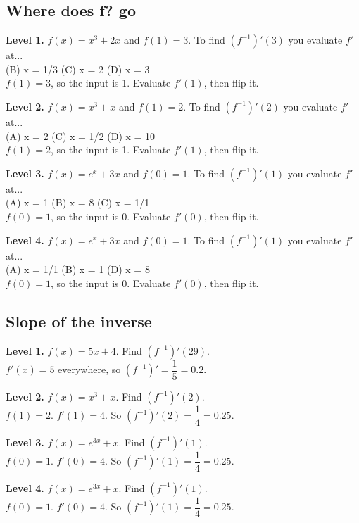 \documentclass[11pt]{article}
\begin{document}
\subsection*{Where does f? go}
\noindent\textbf{Level 1.} $f(x)=x^{3}+2x$ and $f(1)=3$. To find $(f^{-1})'(3)$ you evaluate $f'$ at...\\  \quad (B) x = 1/3 \quad (C) x = 2 \quad (D) x = 3\\  \quad $f(1)=3$, so the input is 1. Evaluate $f'(1)$, then flip it.\par\medskip
\noindent\textbf{Level 2.} $f(x)=x^{3}+x$ and $f(1)=2$. To find $(f^{-1})'(2)$ you evaluate $f'$ at...\\ (A) x = 2 \quad {} \quad (C) x = 1/2 \quad (D) x = 10\\  \quad $f(1)=2$, so the input is 1. Evaluate $f'(1)$, then flip it.\par\medskip
\noindent\textbf{Level 3.} $f(x)=e^{x}+3x$ and $f(0)=1$. To find $(f^{-1})'(1)$ you evaluate $f'$ at...\\ (A) x = 1 \quad (B) x = 8 \quad (C) x = 1/1 \quad {}\\  \quad $f(0)=1$, so the input is 0. Evaluate $f'(0)$, then flip it.\par\medskip
\noindent\textbf{Level 4.} $f(x)=e^{x}+3x$ and $f(0)=1$. To find $(f^{-1})'(1)$ you evaluate $f'$ at...\\ (A) x = 1/1 \quad (B) x = 1 \quad {} \quad (D) x = 8\\  \quad $f(0)=1$, so the input is 0. Evaluate $f'(0)$, then flip it.\par\medskip
\subsection*{Slope of the inverse}
\noindent\textbf{Level 1.} $f(x)=5x+4$. Find $(f^{-1})'(29)$.\\  \quad $f'(x)=5$ everywhere, so $(f^{-1})'=\dfrac1{5}=0.2$.\par\medskip
\noindent\textbf{Level 2.} $f(x)=x^{3}+x$. Find $(f^{-1})'(2)$.\\  \quad $f(1)=2$. $f'(1)=4$. So $(f^{-1})'(2)=\dfrac1{4}=0.25$.\par\medskip
\noindent\textbf{Level 3.} $f(x)=e^{3x}+x$. Find $(f^{-1})'(1)$.\\  \quad $f(0)=1$. $f'(0)=4$. So $(f^{-1})'(1)=\dfrac1{4}=0.25$.\par\medskip
\noindent\textbf{Level 4.} $f(x)=e^{3x}+x$. Find $(f^{-1})'(1)$.\\  \quad $f(0)=1$. $f'(0)=4$. So $(f^{-1})'(1)=\dfrac1{4}=0.25$.\par\medskip
\end{document}
